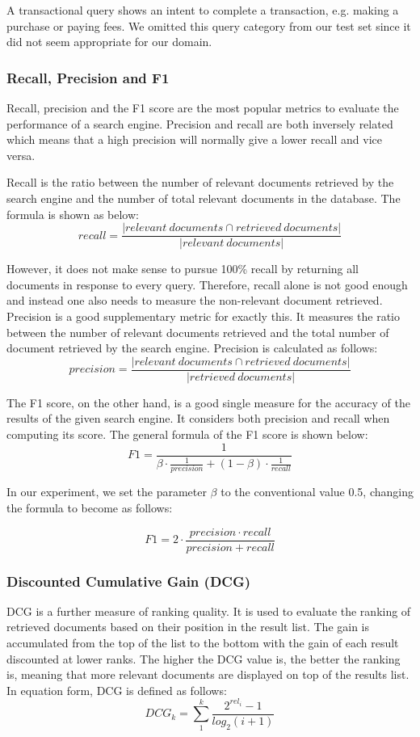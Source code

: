 A transactional query shows an intent to complete a transaction, e.g. making a purchase or paying fees. We omitted this query category from our test set since it did not seem appropriate for our domain.

\subsubsection{Recall, Precision and F1}
Recall, precision and the F1 score are the most popular metrics to evaluate the performance of a search engine. Precision and recall are both inversely related which means that a high precision will normally give a lower recall and vice versa.

Recall is the ratio between the number of relevant documents retrieved by the search engine and the number of total relevant documents in the database. The formula is shown as below:
\[recall=\frac{|relevant\ documents\cap retrieved\ documents|}{|relevant\ documents|}\]

However, it does not make sense to pursue 100\% recall by returning all documents in response to every query. Therefore, recall alone is not good enough and instead one also needs to measure the non-relevant document retrieved. Precision is a good supplementary metric for exactly this. It measures the ratio between the number of relevant documents retrieved and the total number of document retrieved by the search engine. Precision is calculated as follows:
\[precision=\frac{|relevant\ documents\cap retrieved\ documents|}{| retrieved\ documents |}\]

The F1 score, on the other hand, is a good single measure for the accuracy of the results of the given search engine. It considers both precision and recall when computing its score. The general formula of the F1 score is shown below:
\[F1=\frac{1}{\beta \cdot \frac{1}{precision}+(1-\beta)\cdot \frac{1}{recall}}\]

In our experiment, we set the parameter $\beta$ to the conventional value 0.5, changing the formula to become as follows:

\[F1=2\cdot \frac{precision \cdot recall}{precision+recall}\]

\subsubsection{Discounted Cumulative Gain (DCG)}

DCG is a further measure of ranking quality. It is used to evaluate the ranking of retrieved documents based on their position in the result list. The gain is accumulated from the top of the list to the bottom with the gain of each result discounted at lower ranks. The higher the DCG value is, the better the ranking is, meaning that more relevant documents are displayed on top of the results list. In equation form, DCG is defined as follows:
\[DCG_{k}=\sum_1^k \frac{2^{rel_{i}}-1}{log_{2}(i+1)}\]


